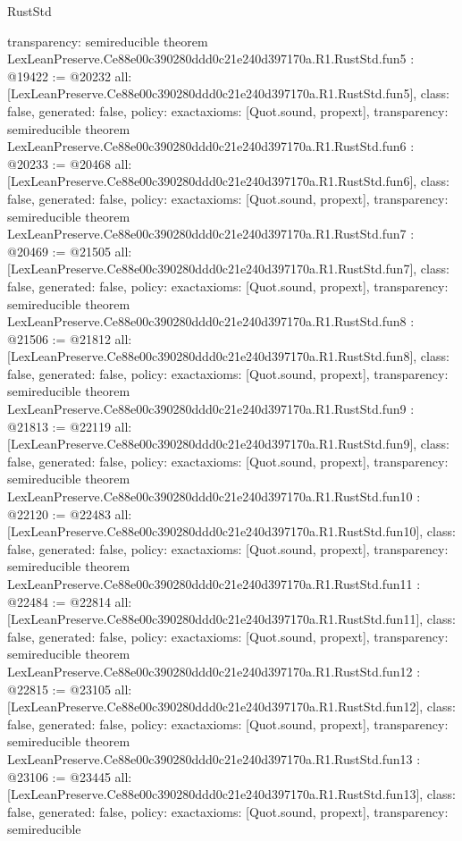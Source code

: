 \begin{lexlean}{RustStd}
\begin{coremodule}
{  transparency: semireducible
}
theorem LexLeanPreserve.Ce88e00c390280ddd0c21e240d397170a.R1.RustStd.fun5 : @19422 := @20232 {
  all: [LexLeanPreserve.Ce88e00c390280ddd0c21e240d397170a.R1.RustStd.fun5],
  class: false,
  generated: false,
  policy: exact{axioms: [Quot.sound, propext]},
  transparency: semireducible
}
theorem LexLeanPreserve.Ce88e00c390280ddd0c21e240d397170a.R1.RustStd.fun6 : @20233 := @20468 {
  all: [LexLeanPreserve.Ce88e00c390280ddd0c21e240d397170a.R1.RustStd.fun6],
  class: false,
  generated: false,
  policy: exact{axioms: [Quot.sound, propext]},
  transparency: semireducible
}
theorem LexLeanPreserve.Ce88e00c390280ddd0c21e240d397170a.R1.RustStd.fun7 : @20469 := @21505 {
  all: [LexLeanPreserve.Ce88e00c390280ddd0c21e240d397170a.R1.RustStd.fun7],
  class: false,
  generated: false,
  policy: exact{axioms: [Quot.sound, propext]},
  transparency: semireducible
}
theorem LexLeanPreserve.Ce88e00c390280ddd0c21e240d397170a.R1.RustStd.fun8 : @21506 := @21812 {
  all: [LexLeanPreserve.Ce88e00c390280ddd0c21e240d397170a.R1.RustStd.fun8],
  class: false,
  generated: false,
  policy: exact{axioms: [Quot.sound, propext]},
  transparency: semireducible
}
theorem LexLeanPreserve.Ce88e00c390280ddd0c21e240d397170a.R1.RustStd.fun9 : @21813 := @22119 {
  all: [LexLeanPreserve.Ce88e00c390280ddd0c21e240d397170a.R1.RustStd.fun9],
  class: false,
  generated: false,
  policy: exact{axioms: [Quot.sound, propext]},
  transparency: semireducible
}
theorem LexLeanPreserve.Ce88e00c390280ddd0c21e240d397170a.R1.RustStd.fun10 : @22120 := @22483 {
  all: [LexLeanPreserve.Ce88e00c390280ddd0c21e240d397170a.R1.RustStd.fun10],
  class: false,
  generated: false,
  policy: exact{axioms: [Quot.sound, propext]},
  transparency: semireducible
}
theorem LexLeanPreserve.Ce88e00c390280ddd0c21e240d397170a.R1.RustStd.fun11 : @22484 := @22814 {
  all: [LexLeanPreserve.Ce88e00c390280ddd0c21e240d397170a.R1.RustStd.fun11],
  class: false,
  generated: false,
  policy: exact{axioms: [Quot.sound, propext]},
  transparency: semireducible
}
theorem LexLeanPreserve.Ce88e00c390280ddd0c21e240d397170a.R1.RustStd.fun12 : @22815 := @23105 {
  all: [LexLeanPreserve.Ce88e00c390280ddd0c21e240d397170a.R1.RustStd.fun12],
  class: false,
  generated: false,
  policy: exact{axioms: [Quot.sound, propext]},
  transparency: semireducible
}
theorem LexLeanPreserve.Ce88e00c390280ddd0c21e240d397170a.R1.RustStd.fun13 : @23106 := @23445 {
  all: [LexLeanPreserve.Ce88e00c390280ddd0c21e240d397170a.R1.RustStd.fun13],
  class: false,
  generated: false,
  policy: exact{axioms: [Quot.sound, propext]},
  transparency: semireducible
}
\end{coremodule}
\end{lexlean}
